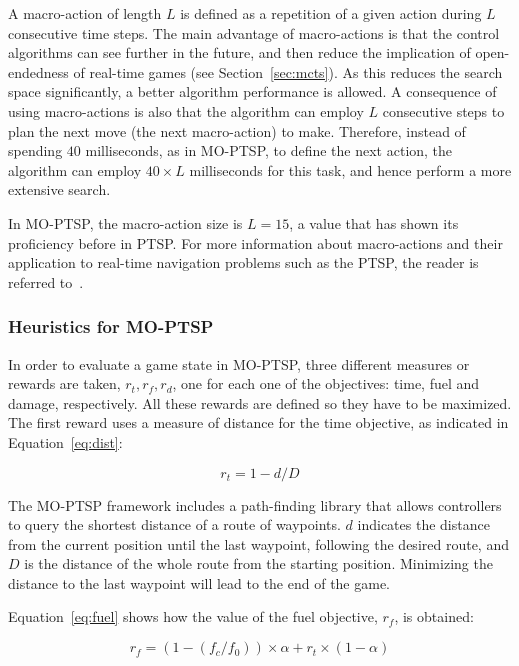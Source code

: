 \documentclass[journal]{IEEEtran}
\begin{document}
A macro-action of length $L$ is defined as a repetition of a given action during $L$ consecutive time steps. The main advantage of macro-actions is that the control algorithms can see further in the future, and then reduce the implication of open-endedness of real-time games (see Section~\ref{sec:mcts}). As this reduces the search space significantly, a better algorithm performance is allowed. A consequence of using macro-actions is also that the algorithm can employ $L$ consecutive steps to plan the next move (the next macro-action) to make. Therefore, instead of spending $40$ milliseconds, as in MO-PTSP, to define the next action, the algorithm can employ $40 \times L$ milliseconds for this task, and hence perform a more extensive search. 

In MO-PTSP, the macro-action size is $L = 15$, a value that has shown its proficiency before in PTSP. For more information about macro-actions and their application to real-time navigation problems such as the PTSP, the reader is referred to~\cite{Perez2013}.

\subsubsection{Heuristics for MO-PTSP} \label{sssec:heurMOPTSP}

In order to evaluate a game state in MO-PTSP, three different measures or rewards are taken, $r_t, r_f, r_d$, one for each one of the objectives: time, fuel and damage, respectively. All these rewards are defined so they have to be maximized. The first reward uses a measure of distance for the time objective, as indicated in Equation~\ref{eq:dist}: 

\begin{equation}	\label{eq:dist}
r_t = 1 - d/D
\end{equation}

The MO-PTSP framework includes a path-finding library that allows controllers to query the shortest distance of a route of waypoints. $d$ indicates the distance from the current position until the last waypoint, following the desired route, and $D$ is the distance of the whole route from the starting position. Minimizing the distance to the last waypoint will lead to the end of the game.

Equation~\ref{eq:fuel} shows how the value of the fuel objective, $r_f$, is obtained:


\begin{equation}	\label{eq:fuel}
r_f = (1 - (f_c/f_0)) \times \alpha + r_t \times (1 - \alpha)
\end{equation}
\end{document}
